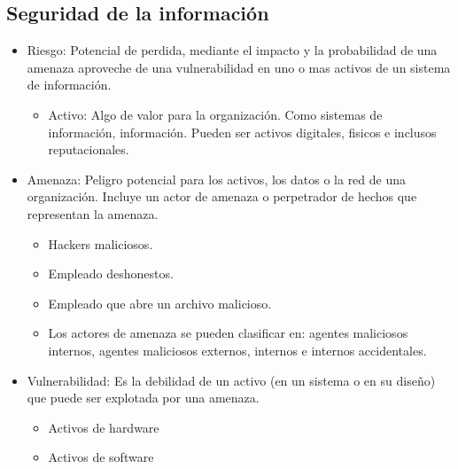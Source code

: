 \documentclass[11pt]{article}
\begin{document}
\subsection{Seguridad de la información}
\label{sec:org7a1fee2}
\begin{itemize}
\item Riesgo: Potencial de perdida, mediante el impacto y la probabilidad de una amenaza aproveche de una vulnerabilidad en uno o mas activos de un sistema de información.
\begin{itemize}
\item Activo: Algo de valor para la organización. Como sistemas de información, información. Pueden ser activos digitales, fisicos e inclusos reputacionales.
\end{itemize}
\item Amenaza: Peligro potencial para los activos, los datos o la red de una organización. Incluye un actor de amenaza o perpetrador de hechos que representan la amenaza.
\begin{itemize}
\item Hackers maliciosos.
\item Empleado deshonestos.
\item Empleado que abre un archivo malicioso.
\item Los actores de amenaza se pueden clasificar en: agentes maliciosos internos, agentes maliciosos externos, internos e internos accidentales.
\end{itemize}
\item Vulnerabilidad: Es la debilidad de un activo (en un sistema o en su diseño) que puede ser explotada por una amenaza.
\begin{itemize}
\item Activos de hardware
\item Activos de software
\end{itemize}
\end{itemize}
\end{document}
